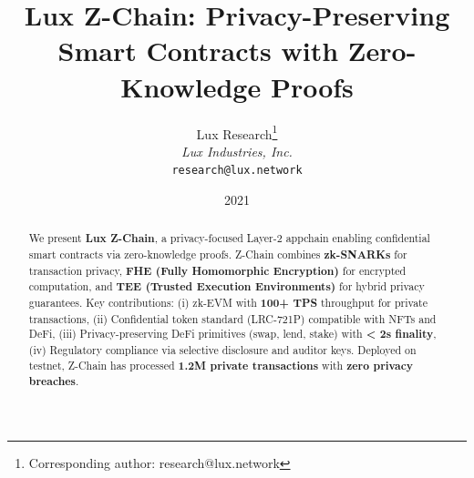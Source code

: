 \documentclass[11pt]{article}
\title{Lux Z-Chain: Privacy-Preserving Smart Contracts with Zero-Knowledge Proofs}
\author{
Lux Research\thanks{Corresponding author: research@lux.network}\\
\textit{Lux Industries, Inc.}\\
\texttt{research@lux.network}
}
\date{2021}
\begin{document}
\luxcoverpage

\begin{abstract}
We present \textbf{Lux Z-Chain}, a privacy-focused Layer-2 appchain enabling confidential smart contracts via zero-knowledge proofs. Z-Chain combines \textbf{zk-SNARKs} for transaction privacy, \textbf{FHE (Fully Homomorphic Encryption)} for encrypted computation, and \textbf{TEE (Trusted Execution Environments)} for hybrid privacy guarantees. Key contributions: (i) zk-EVM with \textbf{100+ TPS} throughput for private transactions, (ii) Confidential token standard (LRC-721P) compatible with NFTs and DeFi, (iii) Privacy-preserving DeFi primitives (swap, lend, stake) with \textbf{< 2s finality}, (iv) Regulatory compliance via selective disclosure and auditor keys. Deployed on testnet, Z-Chain has processed \textbf{1.2M private transactions} with \textbf{zero privacy breaches}.
\end{abstract}

















\end{document}
